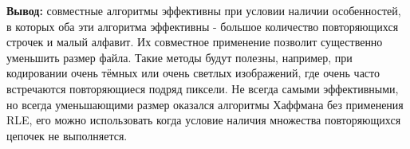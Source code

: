 \documentclass[a4paper,14pt]{extarticle}
\begin{document}
\textbf{Вывод: } совместные алгоритмы эффективны при условии наличии особенностей, в которых оба эти 
алгоритма эффективны - большое количество повторяющихся строчек и малый алфавит. Их совместное
применение позволит существенно уменьшить размер файла.
Такие методы будут полезны, например, при кодировании очень тёмных или очень светлых изображений, где очень часто 
встречаются повторяющиеся подряд пиксели.
Не всегда самыми эффективными, но всегда уменьшающими размер оказался алгоритмы Хаффмана без применения RLE, 
его можно использовать когда условие наличия множества повторяющихся цепочек не выполняется. 
\end{document}
